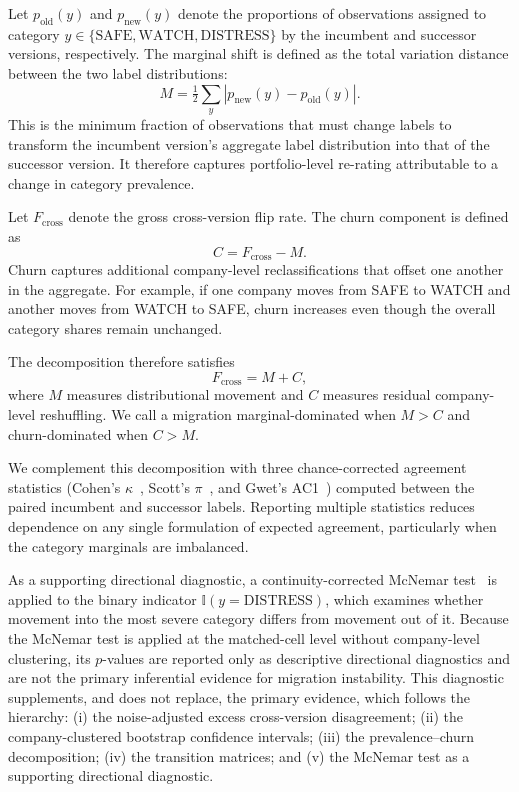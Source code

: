 \documentclass{ieeeaccess}
\begin{document}
Let $p_{\mathrm{old}}(y)$ and $p_{\mathrm{new}}(y)$ denote the proportions of observations assigned to category $y\in\{\text{SAFE},\text{WATCH},\text{DISTRESS}\}$ by the incumbent and successor versions, respectively. The marginal shift is defined as the total variation distance between the two label distributions:
\begin{equation}
M = \tfrac{1}{2} \sum_{y} \left| p_{\mathrm{new}}(y) - p_{\mathrm{old}}(y) \right|.
\end{equation}
This is the minimum fraction of observations that must change labels to transform the incumbent version's aggregate label distribution into that of the successor version. It therefore captures portfolio-level re-rating attributable to a change in category prevalence.

Let $F_{\mathrm{cross}}$ denote the gross cross-version flip rate. The churn component is defined as
\begin{equation}
C = F_{\mathrm{cross}}-M.
\end{equation}
Churn captures additional company-level reclassifications that offset one another in the aggregate. For example, if one company moves from SAFE to WATCH and another moves from WATCH to SAFE, churn increases even though the overall category shares remain unchanged.

The decomposition therefore satisfies
\begin{equation}
F_{\mathrm{cross}}=M+C,
\end{equation}
where $M$ measures distributional movement and $C$ measures residual company-level reshuffling. We call a migration marginal-dominated when $M>C$ and churn-dominated when $C>M$.

We complement this decomposition with three chance-corrected agreement statistics (Cohen's $\kappa$~\cite{cohen}, Scott's $\pi$~\cite{scott}, and Gwet's AC1~\cite{gwet}) computed between the paired incumbent and successor labels. Reporting multiple statistics reduces dependence on any single formulation of expected agreement, particularly when the category marginals are imbalanced.

As a supporting directional diagnostic, a continuity-corrected McNemar test~\cite{mcnemar} is applied to the binary indicator $\mathbb{I}(y=\text{DISTRESS})$, which examines whether movement into the most severe category differs from movement out of it. Because the McNemar test is applied at the matched-cell level without company-level clustering, its $p$-values are reported only as descriptive directional diagnostics and are not the primary inferential evidence for migration instability. This diagnostic supplements, and does not replace, the primary evidence, which follows the hierarchy: (i) the noise-adjusted excess cross-version disagreement; (ii) the company-clustered bootstrap confidence intervals; (iii) the prevalence--churn decomposition; (iv) the transition matrices; and (v) the McNemar test as a supporting directional diagnostic.
\end{document}

